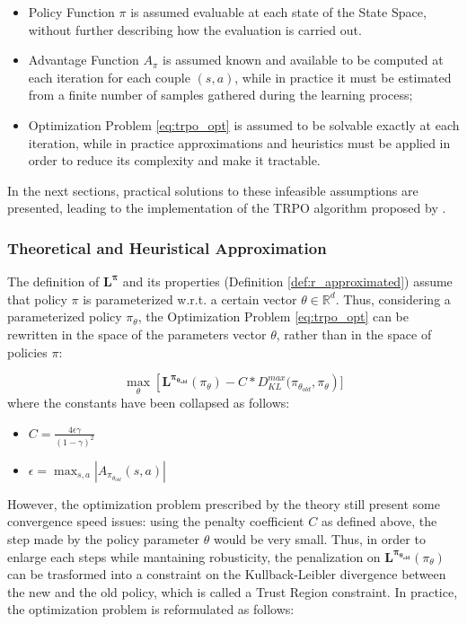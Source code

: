             \begin{itemize}
                \item Policy Function $\pi$ is assumed evaluable at each state of the State Space, without further describing how the evaluation is carried out.
                \item Advantage Function $A_{\pi}$ is assumed known and available to be computed at each iteration for each couple $(s, a)$, while in practice it must be estimated from a finite number of samples gathered during the learning process;
                \item Optimization Problem \ref{eq:trpo_opt} is assumed to be solvable exactly at each iteration, while in practice approximations and heuristics must be applied in order to reduce its complexity and make it tractable.
            \end{itemize}
            
            In the next sections, practical solutions to these infeasible assumptions are presented, leading to the implementation of the TRPO algorithm proposed by .
                
            \subsubsection{Theoretical and Heuristical Approximation}
                The definition of $\mathbf{L^{\pi}}$ and its properties (Definition \ref{def:r_approximated}) assume that policy $\pi$ is parameterized w.r.t. a certain vector $\theta \in \mathbb{R}^d$.  Thus, considering a parameterized policy $\pi_{\theta}$, the Optimization Problem \ref{eq:trpo_opt} can be rewritten in the space of the parameters vector $\theta$, rather than in the space of policies $\pi$:
                
                \begin{equation}
                    \label{eq:trpo_opt_theta}
                    \max_{\theta} \left[ \mathbf{L^{\pi_{\theta_{old}}}}(\pi_{\theta}) - C*D_{KL}^{max}(\pi_{\theta_{old}}, \pi_{\theta}\right)]
                \end{equation}
                where the constants have been collapsed as follows:
                \begin{itemize}
                    \item $C = \frac{4 \epsilon \gamma}{\left( 1 - \gamma \right)^2}$
                    \item $\epsilon = \max_{s, a} | A_{\pi_{\theta_{old}}}(s, a) |$
                \end{itemize}
                However, the optimization problem prescribed by the theory still present some convergence speed issues: using the penalty coefficient $C$ as defined above, the step made by the policy parameter $\theta$ would be very small. Thus, in order to enlarge each steps while mantaining robusticity, the penalization on $\mathbf{L^{\pi_{\theta_{old}}}}(\pi_{\theta})$ can be trasformed into a constraint on the Kullback-Leibler divergence between the new and the old policy, which is called a Trust Region constraint. In practice, the optimization problem is reformulated as follows:
                
